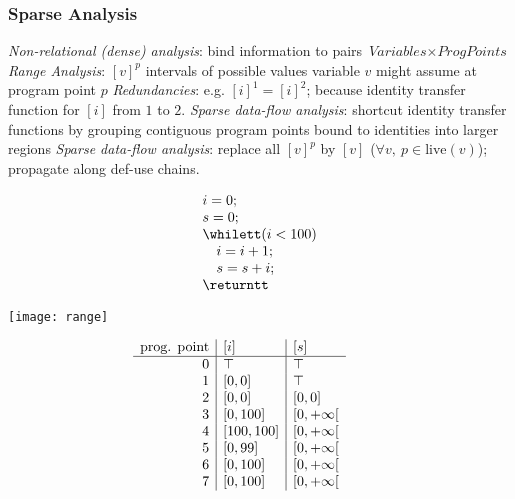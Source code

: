 \begin{frame}
\frametitle{Sparse Analysis}
\begin{block}{}
  \begin{overprint}
  \onslide<+>
    \emph{Non-relational (dense) analysis}: bind information to pairs $\textit{Variables}\times \textit{ProgPoints}$
  \onslide<+>
    \emph{Range Analysis}: $[v]^p$ intervals of possible values variable $v$ might assume at program point $p$
  \onslide<+>
    \emph{Redundancies}: e.g. $[i]^1 = [i]^2$; because identity transfer function for $[i]$ from $1$ to $2$.  
  \onslide<+>
    \emph{Sparse data-flow analysis}: shortcut identity transfer functions by grouping contiguous program points bound to identities into larger regions
  \onslide<+>
    \emph{Sparse data-flow analysis}: replace all $[v]^p$ by $[v]$ ($\forall v,\ p\in \textrm{live}(v)$); propagate along def-use chains.
  \end{overprint}
\end{block}%


\vfill
\begin{minipage}[b]{0.2\textwidth}%
\small
\begin{equation*}
\begin{array}[b]{l}
i=0;\\
s=0;\\
\whilett (i<100)\\
\quad i=i+1;\\
\quad s=s+i;\\
\returntt
\end{array}
\end{equation*}
\vspace{1.5cm}
\end{minipage}
\begin{minipage}[b]{0.4\textwidth}%
\texttt{[image: range]}
\end{minipage}\hfill
\begin{minipage}[b]{0.35\textwidth}
\small
\begin{equation*}
\hspace{-1cm}
\begin{array}[b]{r|l|l}
\textrm{prog. point} & [i] & [s]\\ \hline
0 & \top & \top\\
1 & [0,0] & \top\\
2 & [0,0] & [0,0]\\
3 & [0,100] & [0, +\infty[\\
4 & [100,100] & [0,+\infty[\\
5 & [0,99] & [0,+\infty[\\
6 & [0,100] & [0,+\infty[\\
7 & [0,100] & [0,+\infty[\\
\end{array}
\end{equation*}
\vspace{0.5cm}
\end{minipage}
\end{frame}

